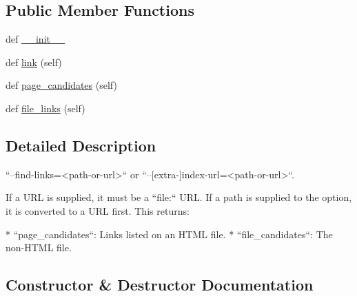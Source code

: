 \subsection*{Public Member Functions}
\begin{DoxyCompactItemize}
\item 
def \hyperlink{classpip_1_1__internal_1_1index_1_1sources_1_1__LocalFileSource_aca0c0ba56be91d3c8fb7b199adb53d77}{\+\_\+\+\_\+init\+\_\+\+\_\+}
\item 
def \hyperlink{classpip_1_1__internal_1_1index_1_1sources_1_1__LocalFileSource_a0dffaeb199e5081bb045ad162ae94790}{link} (self)
\item 
def \hyperlink{classpip_1_1__internal_1_1index_1_1sources_1_1__LocalFileSource_a6bb7269454221893f45a8d772cbe654f}{page\+\_\+candidates} (self)
\item 
def \hyperlink{classpip_1_1__internal_1_1index_1_1sources_1_1__LocalFileSource_a722ded99eb7e9a9ab94bdafb4edb069a}{file\+\_\+links} (self)
\end{DoxyCompactItemize}


\subsection{Detailed Description}
\begin{DoxyVerb}``--find-links=<path-or-url>`` or ``--[extra-]index-url=<path-or-url>``.

If a URL is supplied, it must be a ``file:`` URL. If a path is supplied to
the option, it is converted to a URL first. This returns:

* ``page_candidates``: Links listed on an HTML file.
* ``file_candidates``: The non-HTML file.
\end{DoxyVerb}
 

\subsection{Constructor \& Destructor Documentation}
\mbox{\label{classpip_1_1__internal_1_1index_1_1sources_1_1__LocalFileSource_aca0c0ba56be91d3c8fb7b199adb53d77}} 
